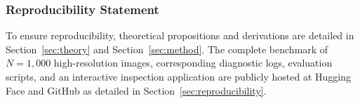 \documentclass{article}
\theoremstyle{definition}
\begin{document}
\subsubsection*{Reproducibility Statement}
To ensure reproducibility, theoretical propositions and derivations are detailed in Section~\ref{sec:theory} and Section~\ref{sec:method}. The complete benchmark of $N=1,000$ high-resolution images, corresponding diagnostic logs, evaluation scripts, and an interactive inspection application are publicly hosted at Hugging Face and GitHub as detailed in Section~\ref{sec:reproducibility}.



\end{document}
